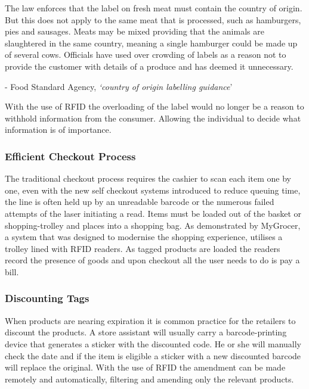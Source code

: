 \documentclass[a4paper, 11pt]{article}
\begin{document}
The law enforces that the label on fresh meat must contain the country of origin. But this does not apply to the same meat that is processed, such as hamburgers, pies and sausages. Meats may be mixed providing that the animals are slaughtered in the same country, meaning a single hamburger could be made up of several cows.\cite{FSA} Officials have used over crowding of labels as a reason not to provide the customer with details of a produce and has deemed it unnecessary. 

\vspace{\baselineskip}
\begin{quoting}
- Food Standard Agency, \emph{`country of origin labelling guidance}'\cite{FSA}
\end{quoting}
\vspace{\baselineskip}

With the use of RFID the overloading of the label would no longer be a reason to withhold information from the consumer. Allowing the individual to decide what information is of importance.

\subsubsection{Efficient Checkout Process} The traditional checkout process requires the cashier to scan each item one by one, even with the new self checkout systems introduced to reduce queuing time, the line is often held up by an unreadable barcode or the numerous failed attempts of the laser initiating a read. Items must be loaded out of the basket or shopping-trolley and places into a shopping bag. As demonstrated by MyGrocer, a system that was designed to modernise the shopping experience, utilises a trolley lined with RFID readers. As tagged products are loaded the readers record the presence of goods and upon checkout all the user needs to do is pay a bill. 

\subsubsection{Discounting Tags} When products are nearing expiration it is common practice for the retailers to discount the products. A store assistant will usually carry a barcode-printing device that generates a sticker with the discounted code. He or she will manually check the date and if the item is eligible a sticker with a new discounted barcode will replace the original. With the use of RFID the amendment can be made remotely and automatically, filtering and amending only the relevant products. 
\end{document}
